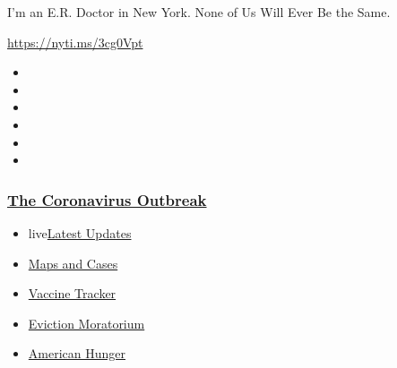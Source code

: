 I'm an E.R. Doctor in New York. None of Us Will Ever Be the Same.

\url{https://nyti.ms/3cg0Vpt}

\begin{itemize}
\item
\item
\item
\item
\item
\item
\end{itemize}

\hypertarget{the-coronavirus-outbreak}{%
\subsubsection{\texorpdfstring{\href{https://www.nytimes3xbfgragh.onion/news-event/coronavirus?name=styln-coronavirus-national\&region=TOP_BANNER\&block=storyline_menu_recirc\&action=click\&pgtype=Article\&impression_id=8fd33900-f1e9-11ea-bc23-b3853583cdbc\&variant=undefined}{The
Coronavirus
Outbreak}}{The Coronavirus Outbreak}}\label{the-coronavirus-outbreak}}

\begin{itemize}
\tightlist
\item
  live\href{https://www.nytimes3xbfgragh.onion/2020/09/08/world/covid-19-coronavirus.html?name=styln-coronavirus-national\&region=TOP_BANNER\&block=storyline_menu_recirc\&action=click\&pgtype=Article\&impression_id=8fd36010-f1e9-11ea-bc23-b3853583cdbc\&variant=undefined}{Latest
  Updates}
\item
  \href{https://www.nytimes3xbfgragh.onion/interactive/2020/us/coronavirus-us-cases.html?name=styln-coronavirus-national\&region=TOP_BANNER\&block=storyline_menu_recirc\&action=click\&pgtype=Article\&impression_id=8fd36011-f1e9-11ea-bc23-b3853583cdbc\&variant=undefined}{Maps
  and Cases}
\item
  \href{https://www.nytimes3xbfgragh.onion/interactive/2020/science/coronavirus-vaccine-tracker.html?name=styln-coronavirus-national\&region=TOP_BANNER\&block=storyline_menu_recirc\&action=click\&pgtype=Article\&impression_id=8fd36012-f1e9-11ea-bc23-b3853583cdbc\&variant=undefined}{Vaccine
  Tracker}
\item
  \href{https://www.nytimes3xbfgragh.onion/2020/09/02/your-money/eviction-moratorium-covid.html?name=styln-coronavirus-national\&region=TOP_BANNER\&block=storyline_menu_recirc\&action=click\&pgtype=Article\&impression_id=8fd36013-f1e9-11ea-bc23-b3853583cdbc\&variant=undefined}{Eviction
  Moratorium}
\item
  \href{https://www.nytimes3xbfgragh.onion/interactive/2020/09/02/magazine/food-insecurity-hunger-us.html?name=styln-coronavirus-national\&region=TOP_BANNER\&block=storyline_menu_recirc\&action=click\&pgtype=Article\&impression_id=8fd36014-f1e9-11ea-bc23-b3853583cdbc\&variant=undefined}{American
  Hunger}
\end{itemize}

